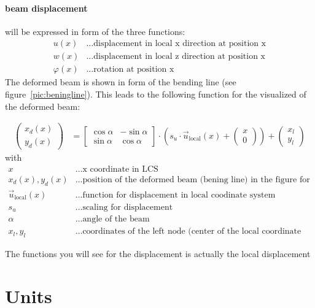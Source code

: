 \documentclass[a4paper,11pt]{report}
\begin{document}
\paragraph{beam displacement} will be expressed in form of the three functions:
\begin{align*}
u(x) &\dots \text{displacement in local x direction at position x}\\
w(x) &\dots \text{displacement in local z direction at position x}\\
\varphi(x) &\dots \text{rotation at position x}
\end{align*}
The deformed beam is shown in form of the bending line (see figure~\ref{pic:beningline}). This leads to the following function for the visualized of the deformed beam:

\begin{align}
\left(\begin{array}{r} x_d(x)\\ y_d(x) \end{array} \right) &= \left[\begin{array}{rr} \cos\alpha & -\sin\alpha \\ \sin\alpha & \cos\alpha\end{array}\right] \cdot \left( s_u \cdot \vec{u}_\text{local}(x) + \left(\begin{array}{r} x \\ 0 \end{array}\right) \right) + \left(\begin{array}{r} x_l \\ y_l \end{array}\right)
\end{align}
with
\begin{align*}
x &\dots \text{x coordinate in LCS}\\
x_d(x), y_d(x) &\dots \text{position of the deformed beam (bening line) in the figure for beam position x}\\
\vec{u}_\text{local}(x) &\dots \text{function for displacement in local coodinate system}\\
s_u &\dots \text{scaling for displacement}\\
\alpha &\dots \text{angle of the beam}\\
x_l, y_l &\dots \text{coordinates of the left node (center of the local coordinate system)}
\end{align*}

The functions you will see for the displacement is actually the local displacement 
\section{Units}
\end{document}

